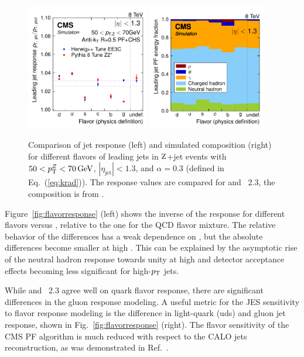 \documentclass[11pt,twoside,a4paper,cmspaper,final,collab]{cms-tdr}
\begin{document}
\begin{figure}[htbp!]
\includegraphics[width=0.48\textwidth]{Figure_029-a.pdf}
\includegraphics[width=0.46\textwidth]{Figure_029-b.pdf}
\caption{\label{fig:pyhw}
Comparison of jet response (left) and simulated composition (right) for different flavors of leading jets in $\mathrm{Z}$+jet events with $50<p_{\mathrm{T}}^Z<70\,\text{Ge\hspace{-.08em}V}$, $|\eta_\text{jet}|<1.3$, and $\alpha=0.3$ (defined in Eq.~(\ref{eq:krad})). The response values are compared for  and \HERWIGpp~2.3, the composition is from .}
\end{figure}

Figure~\ref{fig:flavorresponse} (left) shows the inverse of the response for different flavors versus \pt, relative to the one for the QCD flavor mixture.
The relative behavior of the differences has a weak dependence on \pt, but the absolute differences become smaller at high \pt. This can be explained by the asymptotic rise of the neutral hadron response towards unity at high \pt and detector acceptance effects becoming less significant for high-$p_{\mathrm{T}}$ jets.

While  and \HERWIGpp~2.3 agree well on quark flavor response, there are significant differences in the gluon response modeling. A useful metric for the JES sensitivity to flavor response modeling is the difference in light-quark (uds) and gluon jet response, shown in Fig.~\ref{fig:flavorresponse} (right).
The flavor sensitivity of the CMS PF algorithm is much reduced with respect to the CALO jets reconstruction, as was demonstrated in Ref.~\cite{JEC_JINST}.
\end{document}

